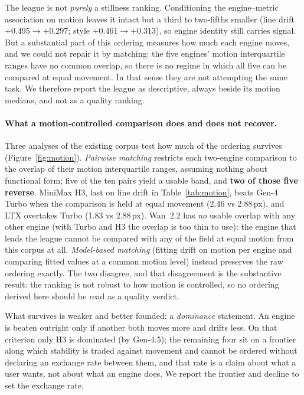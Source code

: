 \documentclass[11pt]{article}
\begin{document}
The league is not \emph{purely} a stillness ranking. Conditioning the
engine--metric association on motion leaves it intact but a third to two-fifths
smaller (line drift $+0.495 \rightarrow +0.297$; style $+0.461 \rightarrow
+0.313$), so engine identity still carries signal. But a substantial part of this
ordering measures how much each engine moves, and
we could not repair it by matching: the five engines' motion interquartile
ranges have no common overlap, so there is no regime in which all five can be
compared at equal movement. In that sense they are not attempting the same task. We
therefore report the league as descriptive, always beside its motion medians,
and not as a quality ranking.

\paragraph{What a motion-controlled comparison does and does not recover.}
Three analyses of the existing corpus test how much of the ordering survives
(Figure~\ref{fig:motion}). \emph{Pairwise matching} restricts each two-engine
comparison to the overlap of their motion interquartile ranges, assuming
nothing about functional form; five of the ten pairs yield a usable band, and
\textbf{two of those five reverse}. MiniMax H3, last on line drift in
Table~\ref{tab:motion}, beats Gen-4 Turbo when the comparison is held at
equal movement (2.46 vs 2.88\,px), and LTX overtakes Turbo (1.83 vs
2.88\,px). Wan~2.2 has \emph{no} usable overlap with any other engine (with
Turbo and H3 the overlap is too thin to use): the engine that leads the
league cannot be compared with any of the field at equal motion from this
corpus at all.
\emph{Model-based matching} (fitting drift on motion per engine and
comparing fitted values at a common motion level) instead preserves the raw
ordering exactly. The two disagree, and that disagreement is the substantive
result: the ranking is not robust to how motion is controlled, so no ordering
derived here should be read as a quality verdict.

What survives is weaker and better founded: a \emph{dominance} statement. An
engine is beaten outright only if another both moves more and drifts less. On
that criterion only H3 is dominated (by Gen-4.5); the remaining four sit on a
frontier along which stability is traded against movement and cannot be
ordered without declaring an exchange rate between them, and that rate is a claim
about what a user wants, not about what an engine does. We report the frontier
and decline to set the exchange rate.
\end{document}

